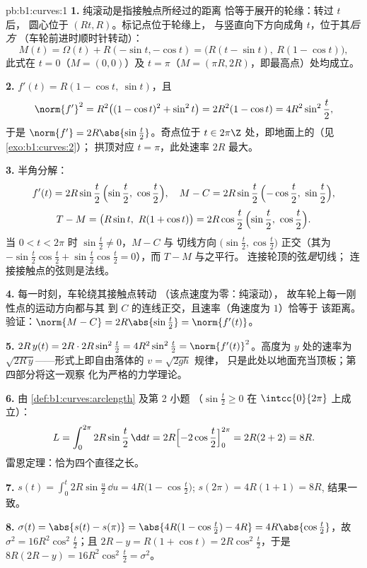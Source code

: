 \begin{solution}{pb:b1:curves:1}
\textbf{1.} 纯滚动是指接触点所经过的距离
恰等于展开的轮缘：转过 $t$ 后，
圆心位于 $(Rt, R)$。标记点位于轮缘上，
与竖直向下方向成角 $t$，位于其\emph{后方}
（车轮前进时顺时针转动）：
\[
M(t) = \Omega(t) + R(-\sin t, -\cos t)
= \bigl(R(t - \sin t),\ R(1 - \cos t)\bigr),
\]
此式在 $t = 0$（$M = (0,0)$）及 $t = \pi$（$M =
(\pi R, 2R)$，即最高点）处均成立。

\textbf{2.} $f'(t) = R(1 - \cos t,\ \sin t)$，且
\[
\norm{f'}^2 = R^2\bigl((1-\cos t)^2 + \sin^2 t\bigr)
= 2R^2(1 - \cos t) = 4R^2\sin^2\frac t2 ,
\]
于是 $\norm{f'} = 2R\abs{\sin\frac t2}$。奇点位于 $t \in
2\pi\Z$ 处，即地面上的（见\cref{exo:b1:curves:2}）；
拱顶对应 $t = \pi$，此处速率 $2R$ 最大。

\textbf{3.} 半角分解：
\[
f'(t) = 2R\sin\frac t2\,\Bigl(\sin\frac t2,\ \cos\frac t2\Bigr),
\quad
M - C = 2R\sin\frac t2\,\Bigl(-\cos\frac t2,\ \sin\frac t2\Bigr),
\]
\[
T - M = \bigl(R\sin t,\ R(1 + \cos t)\bigr)
= 2R\cos\frac t2\,\Bigl(\sin\frac t2,\ \cos\frac t2\Bigr).
\]
当 $0 < t < 2\pi$ 时 $\sin\frac t2 \neq 0$，$M - C$ 与
切线方向 $\bigl(\sin\frac t2, \cos\frac
t2\bigr)$ 正交（其为 $-\sin\frac t2\cos\frac t2 +
\sin\frac t2\cos\frac t2 = 0$），而 $T - M$ 与之平行。
连接轮顶的弦\emph{是}切线；
连接接触点的弦则是法线。

\textbf{4.} 每一时刻，车轮绕其接触点转动
（该点速度为零：纯滚动），
故车轮上每一刚性点的运动方向都与其
到 $C$ 的连线正交，且速率（角速度为 $1$）恰等于
该距离。验证：$\norm{M - C} = 2R\abs{\sin\frac t2} =
\norm{f'(t)}$。

\textbf{5.} $2R\,y(t) = 2R\cdot 2R\sin^2\frac t2 =
4R^2\sin^2\frac t2 = \norm{f'(t)}^2$。高度为 $y$ 处的速率为
$\sqrt{2R\,y}$——形式上即自由落体的 $v = \sqrt{2gh}$ 规律，
只是此处以地面充当顶板；第四部分将这一观察
化为严格的力学理论。

\textbf{6.} 由 \cref{def:b1:curves:arclength} 及第 2 小题
（$\sin\frac t2 \geq 0$ 在 $\intcc{0}{2\pi}$ 上成立）：
\[
L = \int_0^{2\pi} 2R\sin\frac t2\,\dd t
= 2R\Bigl[-2\cos\frac t2\Bigr]_0^{2\pi} = 2R(2 + 2) = 8R .
\]
雷恩定理：恰为四个直径之长。

\textbf{7.} $s(t) = \int_0^t 2R\sin\frac u2\,\dd u =
4R\bigl(1 - \cos\frac t2\bigr)$; $s(2\pi) = 4R(1+1) = 8R$,
结果一致。

\textbf{8.} $\sigma(t) = \abs{s(t) - s(\pi)} = \abs{4R(1 -
\cos\frac t2) - 4R} = 4R\abs{\cos\frac t2}$，故 $\sigma^2 =
16R^2\cos^2\frac t2$；且 $2R - y = R(1 + \cos t) =
2R\cos^2\frac t2$，于是 $8R(2R - y) = 16R^2\cos^2\frac t2 =
\sigma^2$。


\end{solution}
